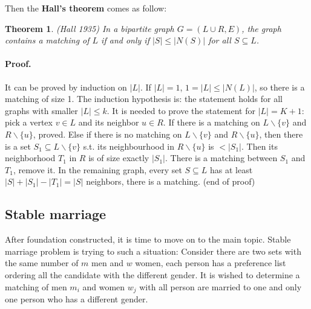 \documentclass[14pt]{extarticle}
\newtheorem{theorem}{Theorem}
\begin{document}
Then the \textbf{Hall's theorem} comes as follow:

\begin{theorem}
  (Hall 1935)
  In a bipartite graph $G=(L \cup R, E)$, the graph contains a matching of $L$ if and only if $\lvert S\rvert \leq \lvert N(S)\rvert$ for all $S \subseteq L$.
\end{theorem}

\paragraph{Proof.} It can be proved by induction on $\lvert L \rvert$. 
If $\lvert L \rvert = 1$, $1 = \lvert L\rvert \leq \lvert N(L)\rvert$, so there is a matching of size 1.
The induction hypothesis is: the statement holds for all graphs with smaller $\lvert L \rvert \leq k$.
It is needed to prove the statement for $\lvert L \rvert = K + 1$: pick a vertex $v \in L$ and its neighbor $u \in R$. 
If there is a matching on $L \backslash \{v\}$ and $R \backslash \{u\}$, proved.
Else if there is no matching on $L \backslash \{v\}$ and $R \backslash \{u\}$, 
then there is a set $S_1 \subseteq L \backslash \{v\}$ s.t. its neighbourhood in $R \backslash \{u\}$ is $<\lvert S_1 \rvert$. 
Then its neighborhood $T_1$ in $R$ is of size exactly $\lvert S_1 \rvert$.
There is a matching between $S_1$ and $T_1$, remove it.
In the remaining graph, every set $S\subseteq L$ has at least $\lvert S \rvert + \lvert S_1 \rvert - \lvert T_1 \rvert = \lvert S \rvert$ neighbors, there is a matching.
(end of proof)

\subsection{Stable marriage}
After foundation constructed, it is time to move on to the main topic.
Stable marriage problem is trying to such a situation: Consider there are two sets with the same number of $m$ men and $w$ women, each person has a preference list ordering all the candidate with the different gender.
It is wished to determine a matching of men $m_i$ and women $w_j$ with all person are married to one and only one person who has a different gender.
\end{document}
